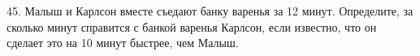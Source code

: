 45. Малыш и Карлсон вместе съедают банку варенья за 12 минут. Определите, за сколько минут справится с банкой варенья Карлсон, если известно, что он сделает это на 10 минут быстрее, чем Малыш.\\
